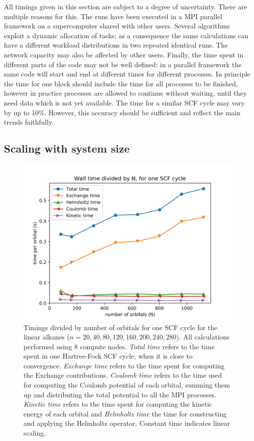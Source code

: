 \documentclass[journal=jctcce, manuscript=article]{achemso}
\begin{document}
All timings given in this section are subject to a degree of uncertainty. There are multiple reasons for this. The runs have been executed in a MPI parallel framework on a supercomputer shared with other users. Several algorithms exploit a dynamic allocation of tasks; as a consequence the same calculations can have a different workload distributions in two repeated identical runs. The network capacity may also be affected by other users. Finally, the time spent in different parts of the code may not be well defined: in a parallel framework the same code will start and end at different times for different processes. In principle the time for one block should include the time for all processes to be finished, however in practice processes are allowed to continue without waiting, until they need data which is not yet available.
The time for a similar \ac{SCF} cycle may vary by up to 10\%. However, this accuracy should be sufficient and reflect the main trends faithfully. 

\subsection{Scaling with system size}

\begin{figure}
\centering
\includegraphics[width=\textwidth]{Times_nAlkanes.png}
\caption{Timings divided by number of orbitals for one \ac{SCF} cycle for the linear alkanes  ($n=20, 40, 80, 120, 160, 200, 240, 280$). All calculations performed using 8 compute nodes. \emph{Total time} refers to the time spent in one Hartree-Fock \ac{SCF} cycle, when it is close to convergence. \emph{Exchange time} refers to the time spent for computing the Exchange contributions. \emph{Coulomb time} refers to the time used for computing the Coulomb potential of each orbital, summing them up and distributing the total potential to all the MPI processes. \emph{Kinetic time} refers to the time spent for computing the kinetic energy of each orbital and \emph{Helmholtz time} the time for constructing and applying the Helmholtz operator. Constant time indicates linear scaling.}
\label{fig02}
\end{figure}
\end{document}
